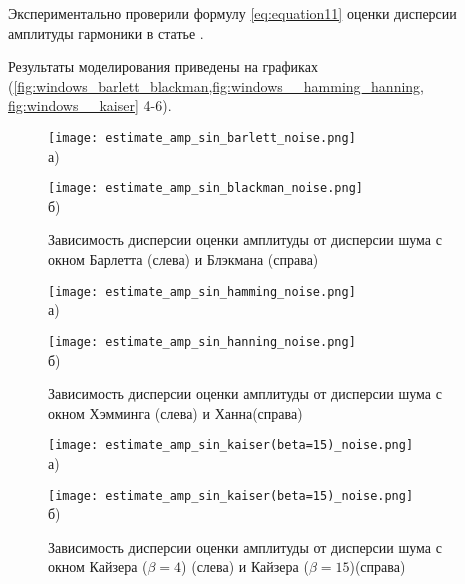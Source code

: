 Экспериментально проверили формулу \ref{eq:equation11} оценки дисперсии амплитуды гармоники в статье \cite{альтман2020граница}.

Результаты моделирования приведены на графиках (\ref{fig:windows_barlett_blackman,fig:windows__hamming_hanning, fig:windows__kaiser} 4-6).

\begin{figure}[ht]
	\begin{minipage}[b][][b]{0.49\linewidth}\centering
		\texttt{[image: estimate\_amp\_sin\_barlett\_noise.png]} \\ а)
	\end{minipage}
	\hfill
	\begin{minipage}[b][][b]{0.49\linewidth}\centering
		\texttt{[image: estimate\_amp\_sin\_blackman\_noise.png]} \\ б)
	\end{minipage}
	\caption{Зависимость дисперсии оценки амплитуды от дисперсии шума с окном Барлетта (слева) и Блэкмана (справа)}
	\label{fig:windows_barlett_blackman}
\end{figure}

\begin{figure}[ht]
	\begin{minipage}[b][][b]{0.49\linewidth}\centering
		\texttt{[image: estimate\_amp\_sin\_hamming\_noise.png]} \\ а)
	\end{minipage}
	\hfill
	\begin{minipage}[b][][b]{0.49\linewidth}\centering
		\texttt{[image: estimate\_amp\_sin\_hanning\_noise.png]} \\ б)
	\end{minipage}
	\caption{Зависимость дисперсии оценки амплитуды от дисперсии шума с окном Хэмминга (слева) и Ханна(справа)}
	\label{fig:windows__hamming_hanning}
\end{figure}


\begin{figure}[ht]
	\begin{minipage}[b][][b]{0.65\linewidth}\centering
		\texttt{[image: estimate\_amp\_sin\_kaiser(beta=15)\_noise.png]} \\ а)
	\end{minipage}
	\hfill
	\begin{minipage}[b][][b]{0.65\linewidth}\centering
		\texttt{[image: estimate\_amp\_sin\_kaiser(beta=15)\_noise.png]} \\ б)
	\end{minipage}
	\caption{Зависимость дисперсии оценки амплитуды от дисперсии шума с окном Кайзера ($\beta=4$) (слева) и Кайзера ($\beta=15$)(справа)}
	\label{fig:windows__kaiser}
\end{figure}

